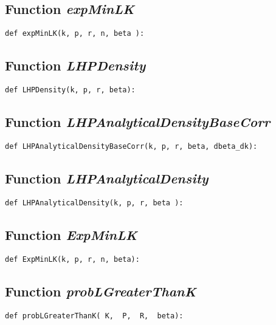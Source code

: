 \documentclass[twoside,11pt]{book}
\begin{document}
\subsection{Function {\it expMinLK}}


\begin{lstlisting}
def expMinLK(k, p, r, n, beta ):
\end{lstlisting}

\subsection{Function {\it LHPDensity}}


\begin{lstlisting}
def LHPDensity(k, p, r, beta):
\end{lstlisting}

\subsection{Function {\it LHPAnalyticalDensityBaseCorr}}


\begin{lstlisting}
def LHPAnalyticalDensityBaseCorr(k, p, r, beta, dbeta_dk):
\end{lstlisting}

\subsection{Function {\it LHPAnalyticalDensity}}


\begin{lstlisting}
def LHPAnalyticalDensity(k, p, r, beta ):
\end{lstlisting}

\subsection{Function {\it ExpMinLK}}


\begin{lstlisting}
def ExpMinLK(k, p, r, n, beta):
\end{lstlisting}

\subsection{Function {\it probLGreaterThanK}}


\begin{lstlisting}
def probLGreaterThanK( K,  P,  R,  beta):
\end{lstlisting}
\end{document}
